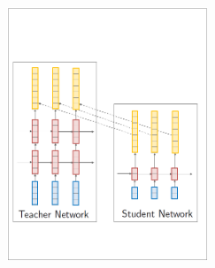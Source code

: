 \documentclass{beamer}
\newcommand{\air}{\vspace{0.25cm}}
\newcommand{\given}{\,|\,}
\newcommand{\xvec}{\mathbf{x}}
\newcommand{\yvec}{\mathbf{y}}
\begin{document}
\begin{frame}
\centerline{}
\air
\begin{figure} 
\center
\includegraphics[width=6cm]{word-kd-2}
\end{figure}
\end{frame}




\end{document}
